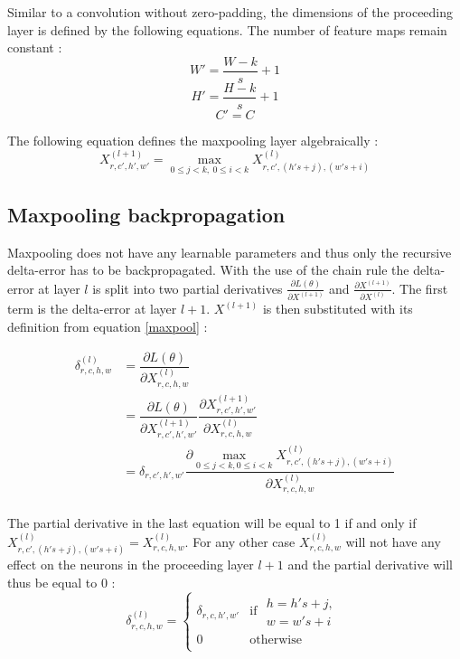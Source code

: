 \documentclass[a4paper, twoside]{article}
\newcommand*{\pd}[2]{\ensuremath{\dfrac{\partial #1}{\partial #2}}}
\newcommand*{\inpd}[2]{\ensuremath{\frac{\partial #1}{\partial #2}}}
\begin{document}
Similar to a convolution without zero-padding, the dimensions of the proceeding layer is defined by the following equations. The number of feature maps remain constant \cite{cs231n} \cite{convmath} \cite{convarithmetic}: 
\begin{equation}
W' = \frac{W-k}{s}+1
\end{equation}
\begin{equation}
H' = \frac{H-k}{s}+1
\end{equation}
\begin{equation}
C' = C
\end{equation}

The following equation defines the maxpooling layer algebraically \cite{cs231n} \cite{convmath}:
\begin{equation}\label{maxpool}
X^{(l+1)}_{r,c',h',w'} = \underset{0 \leq j < k, \ 0 \leq i < k}{\max} X^{(l)}_{r,c',(h's+j),(w's+i)}
\end{equation}

\subsection{Maxpooling backpropagation}
Maxpooling does not have any learnable parameters and thus only the recursive delta-error has to be backpropagated. With the use of the chain rule the delta-error at layer $l$ is split into two partial derivatives $\inpd{L(\theta)}{X^{(l+1)}}$ and $\inpd{X^{(l+1)}}{X^{(l)}}$. The first term is the delta-error at layer $l+1$. $X^{(l+1)}$ is then substituted with its definition from equation \eqref{maxpool} \cite{cs231n} \cite{convmath} \cite{webconv3}: 

\begin{equation}
\begin{split}
	\delta^{(l)}_{r,c,h,w}
		& = \pd{L(\theta)}{X^{(l)}_{r,c,h,w}} \\
		& = \pd{L(\theta)}{X^{(l+1)}_{r,c',h',w'}} \pd{X^{(l+1)}_{r,c',h',w'}}{X^{(l)}_{r,c,h,w}} \\
		& = \delta_{r,c',h',w'} \pd{\underset{0 \leq j < k,0 \leq i < k}{\max} X^{(l)}_{r,c',(h's+j),(w's+i)}}{X^{(l)}_{r,c,h,w}} \\
\end{split}
\end{equation}

The partial derivative in the last equation will be equal to 1 if and only if $X^{(l)}_{r,c',(h's+j),(w's+i)} = X^{(l)}_{r,c,h,w}$. For any other case $X^{(l)}_{r,c,h,w}$ will not have any effect on the neurons in the proceeding layer $l+1$ and the partial derivative will thus be equal to 0 \cite{cs231n} \cite{convmath} \cite{webconv3}:
\begin{equation}
\delta^{(l)}_{r,c,h,w} = \begin{cases}
				\delta_{r,c,h',w'} & \mbox{if } \begin{split} h = h's+j, \\w = w's+i \end{split}\\
				0 & \mbox{otherwise}\\
			\end{cases}
\end{equation}
\end{document}
